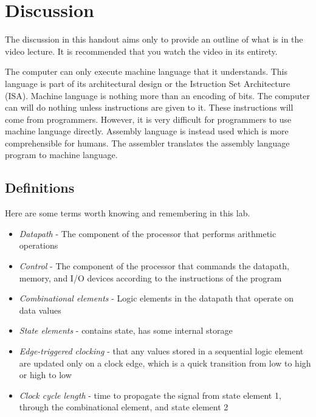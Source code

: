 \documentclass[a4paper, 11pt,oneside]{article}
\begin{document}
\section{Discussion}
The discussion in this handout aims only to provide an outline of what is in the video lecture. It is recommended that you watch the video in its entirety.

The computer can only execute machine language that it understands. This language is part of its architectural design or the Istruction Set Architecture (ISA). Machine language is nothing more than an encoding of bits. The computer can will do nothing unless instructions are given to it. These instructions will come from programmers. However, it is very difficult for programmers to use machine language directly. Assembly language is instead used which is more comprehensible for humans. The assembler translates the assembly language program to machine language. 

\subsection{Definitions}
Here are some terms worth knowing and remembering in this lab.

\begin{itemize}
	\item{\textit{Datapath} - The component of the processor that performs arithmetic operations}

	\item{\textit{Control} - The component of the processor that commands the datapath, memory, and I/O devices according to the instructions of the program}

	\item{\textit{Combinational elements} - Logic elements in the datapath that operate on data values}

	\item{\textit{State elements} - contains state, has some internal storage}

	\item{\textit{Edge-triggered clocking} - that any values stored in a sequential logic element are updated only on a clock edge, which is a quick transition from low to high or high to low}

	\item{\textit{Clock cycle length} - time to propagate the signal from state element 1, through the combinational element, and state element 2}

\end{itemize}
\end{document}
